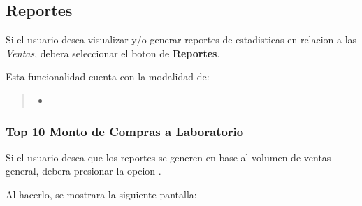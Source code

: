 \documentclass[a4paper,10pt,spanish]{sphinxmanual}
\begin{document}



\subsection{Reportes}
\label{compras:id3}\label{compras:reportes}
Si el usuario desea visualizar y/o generar reportes de estadisticas en relacion a las \emph{Ventas}, debera seleccionar el boton de \textbf{Reportes}.


Esta funcionalidad cuenta con la modalidad de:
\begin{quote}
\begin{itemize}
\item {} 
{\hyperref[compras:top10\string-mont\string-compr\string-pf]{}}

\end{itemize}
\label{compras:top10-mont-compr-pf}\end{quote}


\subsubsection{Top 10 Monto de Compras a Laboratorio}
\label{compras:top-10-monto-de-compras-a-laboratorio}\label{compras:top10-mont-compr-pf}
Si el usuario desea que los reportes se generen en base al volumen de ventas general, debera presionar la opcion .


Al hacerlo, se mostrara la siguiente pantalla:

\end{document}
